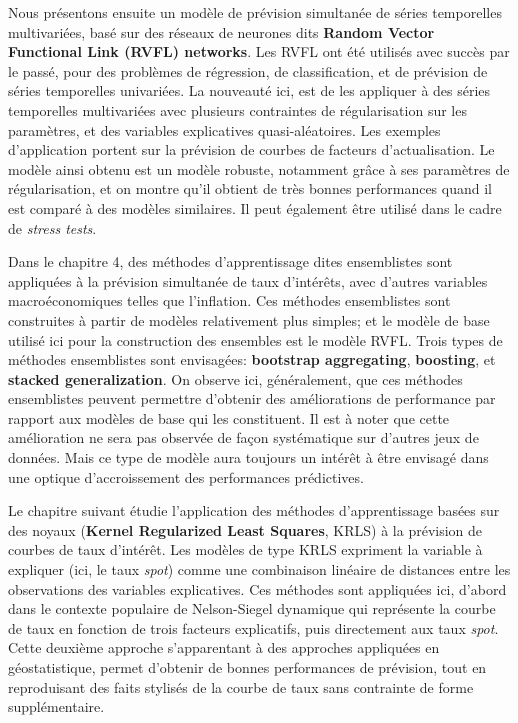 Nous présentons ensuite un modèle de prévision simultanée de séries temporelles multivariées, basé sur des réseaux de neurones dits \textbf{Random Vector Functional Link (RVFL) networks}. Les RVFL ont été utilisés avec succès par le passé, pour des problèmes de régression, de classification, et de prévision de séries temporelles univariées. La nouveauté ici, est de les appliquer à des séries temporelles multivariées avec plusieurs contraintes de régularisation sur les paramètres, et des variables explicatives quasi-aléatoires. Les exemples d'application portent sur la prévision de courbes de facteurs d'actualisation. Le modèle ainsi obtenu est un modèle robuste, notamment grâce à ses paramètres de régularisation, et on montre qu'il obtient de très bonnes performances quand il est comparé à des modèles similaires. Il peut également être utilisé dans le cadre de \textit{stress tests}. 

Dans le chapitre 4, des méthodes d'apprentissage dites ensemblistes sont appliquées à la prévision simultanée de taux d'intérêts, avec d'autres variables macroéconomiques telles que l'inflation. Ces méthodes ensemblistes sont construites à partir de modèles relativement plus simples; et le modèle de base utilisé ici pour la construction des ensembles est le modèle RVFL. Trois types de méthodes ensemblistes sont envisagées: \textbf{bootstrap aggregating},  \textbf{boosting}, et \textbf{stacked generalization}. On observe ici, généralement, que ces méthodes ensemblistes peuvent permettre d'obtenir des améliorations de performance par rapport aux modèles de base qui les constituent. Il est à noter que cette amélioration ne sera pas observée de façon systématique sur d'autres jeux de données. Mais ce type de modèle aura toujours un intérêt à être envisagé dans une optique d'accroissement des performances prédictives. 

Le chapitre suivant étudie l'application des méthodes d'apprentissage basées sur des noyaux (\textbf{Kernel Regularized Least Squares}, KRLS) à la prévision de courbes de taux d'intérêt. Les modèles de type KRLS expriment la variable à expliquer (ici, le taux \textit{spot}) comme une combinaison linéaire de distances entre les observations des variables explicatives. Ces méthodes sont appliquées ici, d'abord dans le contexte populaire de Nelson-Siegel dynamique qui représente la courbe de taux en fonction de trois facteurs explicatifs, puis directement aux taux \textit{spot}. Cette deuxième approche s'apparentant à des approches appliquées en géostatistique, permet d'obtenir de bonnes performances de prévision, tout en reproduisant des faits stylisés de la courbe de taux sans contrainte de forme supplémentaire.

